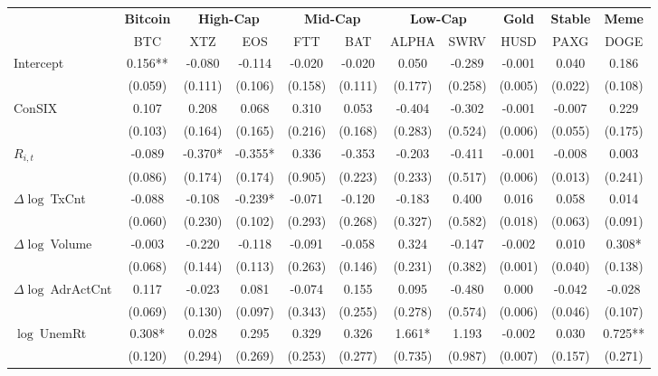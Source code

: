 \begin{table}[ht]
\centering
\scriptsize
\setlength{\tabcolsep}{4pt}
\begin{tabular}{l *{10}{c}}
\toprule
&\multicolumn{1}{c}{\textbf{Bitcoin}}&\multicolumn{2}{c}{\textbf{High-Cap}}&\multicolumn{2}{c}{\textbf{Mid-Cap}}&\multicolumn{2}{c}{\textbf{Low-Cap}}&\multicolumn{1}{c}{\textbf{Gold}}&\multicolumn{1}{c}{\textbf{Stable}}&\multicolumn{1}{c}{\textbf{Meme}}\\
\addlinespace
 & BTC & XTZ & EOS & FTT & BAT & ALPHA & SWRV & HUSD & PAXG & DOGE \\
\midrule
Intercept & 0.156** & -0.080 & -0.114 & -0.020 & -0.020 & 0.050 & -0.289 & -0.001 & 0.040 & 0.186 \\
 & (0.059) & (0.111) & (0.106) & (0.158) & (0.111) & (0.177) & (0.258) & (0.005) & (0.022) & (0.108) \\
\addlinespace
ConSIX & 0.107 & 0.208 & 0.068 & 0.310 & 0.053 & -0.404 & -0.302 & -0.001 & -0.007 & 0.229 \\
 & (0.103) & (0.164) & (0.165) & (0.216) & (0.168) & (0.283) & (0.524) & (0.006) & (0.055) & (0.175) \\
\addlinespace
$R_{i,t}$ & -0.089 & -0.370* & -0.355* & 0.336 & -0.353 & -0.203 & -0.411 & -0.001 & -0.008 & 0.003 \\
 & (0.086) & (0.174) & (0.174) & (0.905) & (0.223) & (0.233) & (0.517) & (0.006) & (0.013) & (0.241) \\
\addlinespace
$\Delta\log\ $TxCnt & -0.088 & -0.108 & -0.239* & -0.071 & -0.120 & -0.183 & 0.400 & 0.016 & 0.058 & 0.014 \\
 & (0.060) & (0.230) & (0.102) & (0.293) & (0.268) & (0.327) & (0.582) & (0.018) & (0.063) & (0.091) \\
\addlinespace
$\Delta\log\ $Volume & -0.003 & -0.220 & -0.118 & -0.091 & -0.058 & 0.324 & -0.147 & -0.002 & 0.010 & 0.308* \\
 & (0.068) & (0.144) & (0.113) & (0.263) & (0.146) & (0.231) & (0.382) & (0.001) & (0.040) & (0.138) \\
\addlinespace
$\Delta\log\ $AdrActCnt & 0.117 & -0.023 & 0.081 & -0.074 & 0.155 & 0.095 & -0.480 & 0.000 & -0.042 & -0.028 \\
 & (0.069) & (0.130) & (0.097) & (0.343) & (0.255) & (0.278) & (0.574) & (0.006) & (0.046) & (0.107) \\
\addlinespace
$\log\ $UnemRt & 0.308* & 0.028 & 0.295 & 0.329 & 0.326 & 1.661* & 1.193 & -0.002 & 0.030 & 0.725** \\
 & (0.120) & (0.294) & (0.269) & (0.253) & (0.277) & (0.735) & (0.987) & (0.007) & (0.157) & (0.271) \\

\end{tabular}
\end{table}
